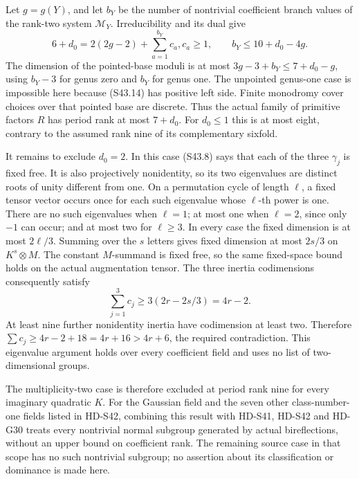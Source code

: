 Let \(g=g(Y)\), and let \(b_Y\) be the number of
nontrivial coefficient branch values of the rank-two system
\(\mathcal M_Y\). Irreducibility and its dual give
\[
       6+d_0=2(2g-2)+\sum_{a=1}^{b_Y}c_a,
                   c_a\ge1,\qquad b_Y\le10+d_0-4g.         \tag{S43.14}
\]
The dimension of the pointed-base moduli is at most
\(3g-3+b_Y\le7+d_0-g\), using \(b_Y-3\) for genus
zero and \(b_Y\) for genus one. The unpointed genus-one
case is impossible here because (S43.14) has positive
left side. Finite monodromy cover choices over that pointed
base are discrete. Thus the actual family of primitive
factors \(R\) has period rank at most \(7+d_0\).
For \(d_0\le1\) this is at most eight, contrary to the
assumed rank nine of its complementary sixfold.

It remains to exclude \(d_0=2\). In this case (S43.8)
says that each of the three \(\gamma_j\) is fixed free.
It is also projectively nonidentity, so its two eigenvalues
are distinct roots of unity different from one. On a
permutation cycle of length \(\ell\), a fixed tensor
vector occurs once for each such eigenvalue whose
\(\ell\)-th power is one. There are no such eigenvalues
when \(\ell=1\); at most one when \(\ell=2\), since
only \(-1\) can occur; and at most two for \(\ell\ge3\).
In every case the fixed dimension is at most
\(2\ell/3\). Summing over the \(s\) letters gives
fixed dimension at most \(2s/3\) on \(K^s\otimes M\).
The constant \(M\)-summand is fixed free, so the same
fixed-space bound holds on the actual augmentation tensor.
The three inertia codimensions consequently satisfy
\[
    \sum_{j=1}^3c_j\ge3(2r-2s/3)=4r-2.
                                                               \tag{S43.15}
\]
At least nine further nonidentity inertia have codimension
at least two. Therefore
\(\sum c_j\ge4r-2+18=4r+16>4r+6\), the required
contradiction. This eigenvalue argument holds over every
coefficient field and uses no list of two-dimensional groups.

The multiplicity-two case is therefore excluded at period
rank nine for every imaginary quadratic \(K\). For the
Gaussian field and the seven other class-number-one fields
listed in HD-S42, combining this result with HD-S41,
HD-S42 and HD-G30 treats every nontrivial normal subgroup
generated by actual bireflections, without an upper bound
on coefficient rank. The remaining source case in that
scope has no such nontrivial subgroup; no assertion about
its classification or dominance is made here.
